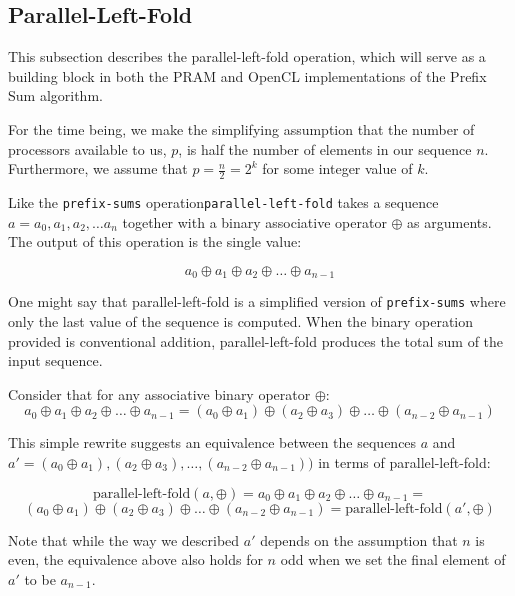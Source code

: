 \documentclass[12pt,twoside]{reedthesis}
\newcommand{\procedure}[1]{{\tt#1}}
\begin{document}
\subsection{Parallel-Left-Fold}

This subsection describes the parallel-left-fold operation, which will serve as a building block in both the PRAM and OpenCL implementations of the Prefix Sum algorithm. 

For the time being, we make the simplifying assumption that the number of processors available to us, $p$, is half the number of elements in our sequence $n$. Furthermore, we assume that $p=\frac{n}{2}=2^k$ for some integer value of $k$.

Like the \procedure{prefix-sums} operation\procedure{parallel-left-fold} takes a sequence $a = a_0, a_1, a_2, \ldots a_n$ together with a binary associative operator $\oplus$ as arguments. The output of this operation is the single value:

$$a_0 \oplus a_1 \oplus a_2 \oplus \ldots \oplus a_{n-1}$$

One might say that parallel-left-fold is a simplified version of \procedure{prefix-sums} where only the last value of the sequence is computed. When the binary operation provided is conventional addition, parallel-left-fold produces the total sum of the input sequence.
\vspace{.5pc}

Consider that for any associative binary operator $\oplus$:
\begin{equation}
a_0 \oplus a_1 \oplus a_2 \oplus \ldots \oplus a_{n-1} = (a_0 \oplus a_1) \oplus (a_2 \oplus a_3) \oplus \ldots \oplus (a_{n-2} \oplus a_{n-1}) \label{assocident}
\end{equation}

This simple rewrite suggests an equivalence between the sequences $a$ and $a' = (a_0 \oplus a_1), (a_2 \oplus a_3), \ldots, (a_{n-2} \oplus a_{n-1}))$ in terms of parallel-left-fold:

$$
\mbox{parallel-left-fold}(a, \oplus) = 
a_0 \oplus a_1 \oplus a_2 \oplus \ldots \oplus a_{n-1} =
$$
\begin{equation}
(a_0 \oplus a_1) \oplus (a_2 \oplus a_3) \oplus \ldots \oplus (a_{n-2} \oplus a_{n-1}) = 
\mbox{parallel-left-fold}(a', \oplus)
\label{pfoldi}
\end{equation}

Note that while the way we described $a'$ depends on the assumption that $n$ is even, the equivalence above also holds for $n$ odd when we set the final element of $a'$ to be $a_{n-1}$.
\vspace{1pc}
\end{document}
